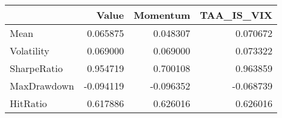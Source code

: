 \begin{tabular}{lrrr}
\toprule
{} &     Value &  Momentum &  TAA\_IS\_VIX \\
\midrule
Mean        &  0.065875 &  0.048307 &    0.070672 \\
Volatility  &  0.069000 &  0.069000 &    0.073322 \\
SharpeRatio &  0.954719 &  0.700108 &    0.963859 \\
MaxDrawdown & -0.094119 & -0.096352 &   -0.068739 \\
HitRatio    &  0.617886 &  0.626016 &    0.626016 \\
\bottomrule
\end{tabular}
